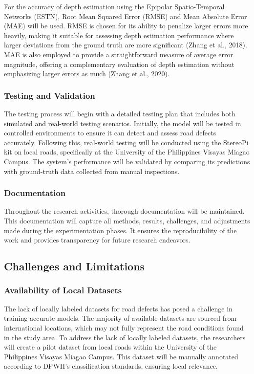 For the accuracy of depth estimation using the Epipolar Spatio-Temporal Networks (ESTN), Root Mean Squared Error (RMSE) and Mean Absolute Error (MAE) will be used. RMSE is chosen for its ability to penalize larger errors more heavily, making it suitable for assessing depth estimation performance where larger deviations from the ground truth are more significant (Zhang et al., 2018). MAE is also employed to provide a straightforward measure of average error magnitude, offering a complementary evaluation of depth estimation without emphasizing larger errors as much (Zhang et al., 2020).

\subsubsection{Testing and Validation}
The testing process will begin with a detailed testing plan that includes both simulated and real-world testing scenarios. Initially, the model will be tested in controlled environments to ensure it can detect and assess road defects accurately. Following this, real-world testing will be conducted using the StereoPi kit on local roads, specifically at the University of the Philippines Visayas Miagao Campus. The system's performance will be validated by comparing its predictions with ground-truth data collected from manual inspections. 

\subsubsection{Documentation}
Throughout the research activities, thorough documentation will be maintained. This documentation will capture all methods, results, challenges, and adjustments made during the experimentation phases. It ensures the reproducibility of the work and provides transparency for future research endeavors. 

\subsection{\textbf{Challenges and Limitations} }
\subsubsection{Availability of Local Datasets}
The lack of locally labeled datasets for road defects has posed a challenge in training accurate models. The majority of available datasets are sourced from international locations, which may not fully represent the road conditions found in the study area. To address the lack of locally labeled datasets, the researchers will create a pilot dataset from local roads within the University of the Philippines Visayas Miagao Campus. This dataset will be manually annotated according to DPWH's classification standards, ensuring local relevance.

